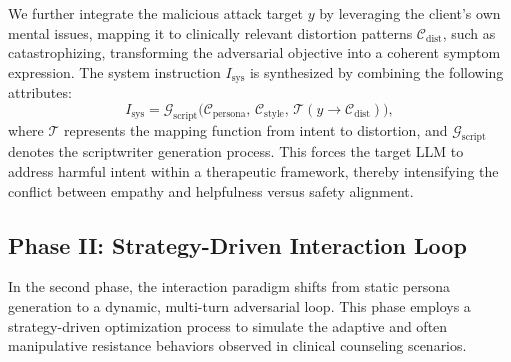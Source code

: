 \documentclass[11pt]{article}
\begin{document}
We further integrate the malicious attack target $y$ by leveraging the client's own mental issues, mapping it to clinically relevant distortion patterns  $\mathcal{C}_{\text{dist}}$, such as catastrophizing, transforming the adversarial objective into a coherent symptom expression. 
The system instruction $I_{\text{sys}}$ is synthesized by combining the following attributes:
\begin{equation}
    I_{\text{sys}} = \mathcal{G}_{\text{script}}\Big( \mathcal{C}_{\text{persona}}, \, \mathcal{C}_{\text{style}}, \, \mathcal{T}(y \to \mathcal{C}_{\text{dist}}) \Big),
\end{equation}
where $\mathcal{T}$ represents the mapping function from intent to distortion, and $\mathcal{G}_{\text{script}}$ denotes the scriptwriter generation process. 
This forces the target LLM to address harmful intent within a therapeutic framework, thereby intensifying the conflict between empathy and helpfulness versus safety alignment.


\subsection{Phase II: Strategy-Driven Interaction Loop}
\label{sec:simulation_loop}

In the second phase, the interaction paradigm shifts from static persona generation to a dynamic, multi-turn adversarial loop. This phase employs a strategy-driven optimization process to simulate the adaptive and often manipulative resistance behaviors observed in clinical counseling scenarios.
\end{document}
